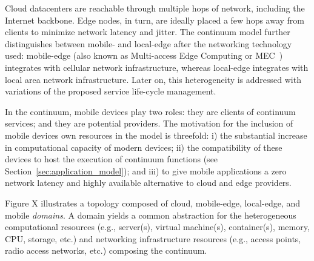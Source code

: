 Cloud datacenters are reachable through multiple hops of network, including the Internet backbone. Edge nodes, in turn, are ideally placed a few hops away from clients to minimize network latency and jitter. The continuum model further distinguishes between mobile- and local-edge after the networking technology used: mobile-edge (also known as Multi-access Edge Computing or MEC~\cite{}) integrates with cellular network infrastructure, whereas local-edge integrates with local area network infrastructure. Later on, this heterogeneity is addressed with variations of the proposed service life-cycle management.

In the continuum, mobile devices play two roles: they are clients of continuum services; and they are potential providers. The motivation for the inclusion of mobile devices own resources in the model is threefold: i) the substantial increase in computational capacity of modern devices; ii) the compatibility of these devices to host the execution of continuum functions (see Section~\ref{sec:application_model}); and iii) to give mobile applications a zero network latency and highly available alternative to cloud and edge providers. 

Figure X illustrates a topology composed of cloud, mobile-edge, local-edge, and mobile \textit{domains}. A domain yields a common abstraction for the heterogeneous computational resources (e.g., server(s), virtual machine(s), container(s), memory, CPU, storage, etc.) and networking infrastructure resources (e.g., access points, radio access networks, etc.) composing the continuum.
 






